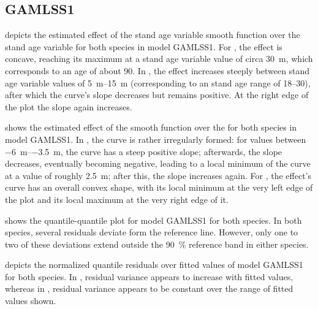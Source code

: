 \subsection{GAMLSS1}

 depicts the estimated effect of the stand age variable smooth function over the stand age variable for both species in model GAMLSS1.  For \Beech{}, the effect is concave, reaching its maximum at a stand age variable value of circa \SI{30}{\meter}, which corresponds to an age of about \SI{90}{\year}.  In \Spruce{}, the effect increases steeply between stand age variable values of \SIrange{5}{15}{\meter} (corresponding to an stand age range of \SIrange{18}{30}{\year}), after which the curve’s slope decreases but remains positive.  At the right edge of the plot the slope again increases.

 shows the estimated effect of the \ProductivityIndexVariableText{} smooth function over the \ProductivityIndexVariableText{} for both species in model GAMLSS1.  In \Beech{}, the curve is rather irregularly formed:  for \ProductivityIndexVariableText{} values between \SIrange{-6}{-3.5}{\meter}, the curve has a steep positive slope;  afterwards, the slope decreases, eventually becoming negative, leading to a local minimum of the curve at a \ProductivityIndexVariableText{} value of roughly \SI{2.5}{\meter}; after this, the slope increases again.  For \Spruce{}, the effect’s curve has an overall convex shape, with its local minimum at the very left edge of the plot and its local maximum at the very right edge of it.

 shows the quantile-quantile plot for model GAMLSS1 for both species.  In both species, several residuals deviate form the reference line.  However, only one to two of these deviations extend outside the \SI{90}{\percent} reference band in either species.

 depicts the normalized quantile residuals over fitted values of model GAMLSS1 for both species.  In \Beech{}, residual variance appears to increase with fitted values, whereas in \Spruce{}, residual variance appears to be constant over the range of fitted values shown.

